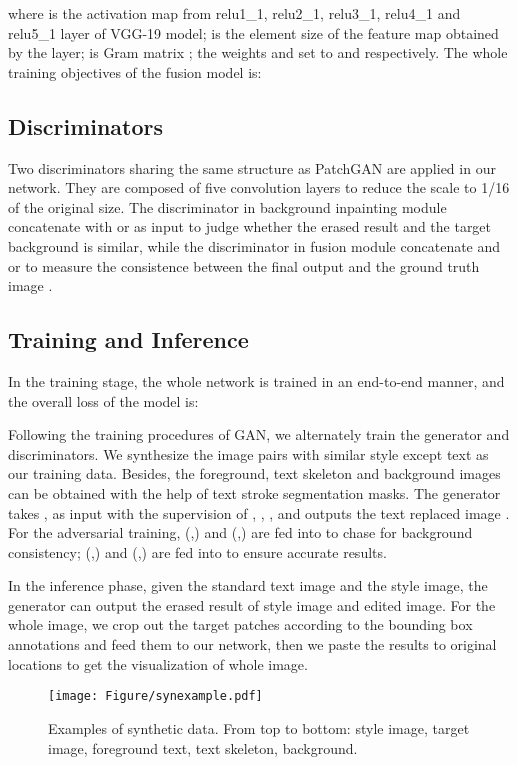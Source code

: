 \documentclass[sigconf]{acmart}
\begin{document}
where  is the activation map from relu1\_1, relu2\_1, relu3\_1, relu4\_1 and relu5\_1 layer of VGG-19 model;  is the element size of the feature map obtained by the  layer;  is Gram matrix ; the weights  and  set to  and  respectively. The whole training objectives of the fusion model is:



\subsection{Discriminators}
\label{sec:Discriminators}
Two discriminators sharing the same structure as PatchGAN\cite{isola2017image} are applied in our network. They are composed of five convolution layers to reduce the scale to 1/16 of the original size. The discriminator  in background inpainting module concatenate  with  or  as input to judge whether the erased result  and the target background  is similar, while the discriminator  in fusion module concatenate  and  or  to measure the consistence between the final output  and the ground truth image . 

\subsection{Training and Inference}
In the training stage, the whole network is trained in an end-to-end manner, and the overall loss of the model is:

Following the training procedures of GAN, we alternately train the generator and discriminators. 
We synthesize the image pairs with similar style except text as our training data. Besides, the foreground, text skeleton and background images can be obtained with the help of text stroke segmentation masks.
The generator takes ,  as input with the supervision of , , ,  and outputs the text replaced image . For the adversarial training, (,) and (,) are fed into  to chase for background consistency; (,) and (,) are fed into  to ensure accurate results.

In the inference phase, given the standard text image and the style image, the generator can output the erased result of style image and edited image. For the whole image, we crop out the target patches according to the bounding box annotations and feed them to our network, then we paste the results to original locations to get the visualization of whole image.



\begin{figure}[t]
    \centering

    \texttt{[image: Figure/synexample.pdf]}

\caption{Examples of synthetic data. From top to bottom: style image, target image, foreground text, text skeleton, background.}
\label{fig:synth}
\vspace{-0.4cm}
\end{figure}
\end{document}
